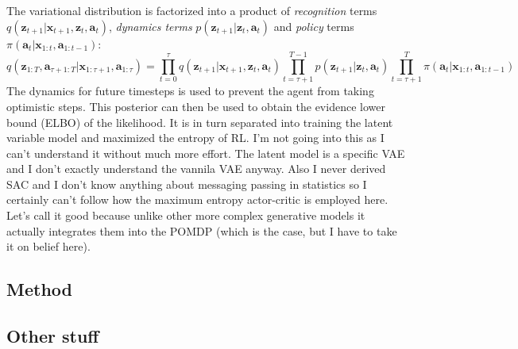 \documentclass{article}
\begin{document}
The variational distribution is factorized into a product of 
\textit{recognition} terms 
$ q (\bm{z}_{t+1} | \bm{x}_{t+1} , \bm{z}_{t}, \bm{a}_{t})  $,
\textit{dynamics terms}
$ p (\bm{z}_{t+1}| \bm{z}_{t}, \bm{a}_{t})  $ and
\textit{policy} terms
$ \pi (\bm{a}_{t} | \bm{x}_{1:t}, \bm{a}_{1:t-1})  $:
\begin{equation}
q (\bm{z}_{1:T}, \bm{a}_{\tau +1:T}| \bm{x}_{1:\tau+1}, \bm{a}_{1:\tau}) =
\prod_{t=0}^{\tau}   q (\bm{z}_{t+1} | \bm{x}_{t+1} , \bm{z}_{t}, \bm{a}_{t}) 
\prod_{t=\tau +1}^{T-1}   p (\bm{z}_{t+1}| \bm{z}_{t}, \bm{a}_{t}) 
\prod_{t=\tau +1}^{T}   \pi (\bm{a}_{t} | \bm{x}_{1:t}, \bm{a}_{1:t-1})  
\end{equation}
The dynamics for future timesteps is used to 
prevent the agent from taking optimistic steps.
This posterior can then be used to obtain the evidence lower bound (ELBO)
of the likelihood.
It is in turn separated into training the latent variable model and
maximized the entropy of RL.
I'm not going into this as I can't understand it without much more effort.
The latent model is a specific VAE and I don't exactly understand
the vannila VAE anyway.
Also I never derived SAC and I don't know anything
about messaging passing in statistics so I certainly can't follow 
how the maximum entropy actor-critic is employed here.
Let's call it good because unlike other more complex generative models
it actually integrates them into the POMDP (which is the case,
but I have to take it on belief here).



\subsection{Method}

\subsection{Other stuff}
\end{document}
